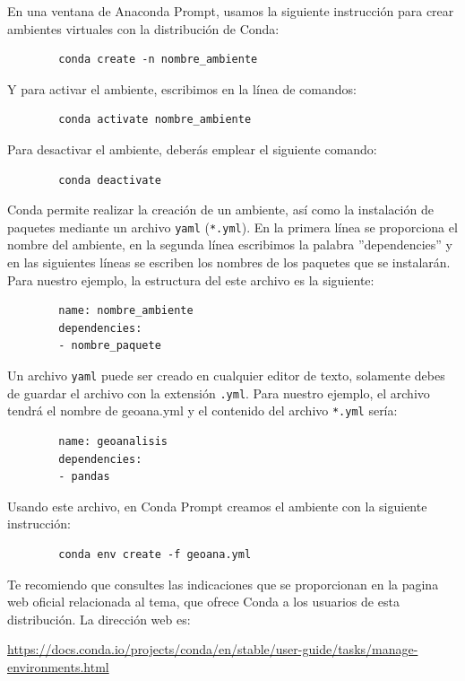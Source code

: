 \documentclass{article}
\begin{document}
	En una ventana de Anaconda Prompt, usamos la siguiente instrucción para crear ambientes virtuales con la distribución de Conda:
	\begin{verbatim}
		conda create -n nombre_ambiente
	\end{verbatim}
	
	Y para activar el ambiente, escribimos en la línea de comandos:
	\begin{verbatim}
		conda activate nombre_ambiente
	\end{verbatim}
	
	Para desactivar el ambiente, deberás emplear el siguiente comando:
	\begin{verbatim}
		conda deactivate 
	\end{verbatim}
	
	Conda permite realizar la creación de un ambiente, así como la instalación de paquetes mediante un archivo \texttt{yaml} (\texttt{*.yml}). En la primera línea se proporciona el nombre del ambiente, en la segunda línea escribimos la palabra ''dependencies'' y en las siguientes líneas se escriben los nombres de los paquetes que se instalarán. Para nuestro ejemplo, la estructura del este archivo es la siguiente:
	\begin{verbatim}
		name: nombre_ambiente
		dependencies:
		- nombre_paquete 
	\end{verbatim}
	
	Un archivo \texttt{yaml} puede ser creado en cualquier editor de texto, solamente debes de guardar el archivo con la extensión \texttt{.yml}. Para nuestro ejemplo, el archivo tendrá el nombre de geoana.yml y el contenido del archivo \texttt{*.yml} sería:
	\begin{verbatim}
		name: geoanalisis
		dependencies:
		- pandas 
	\end{verbatim}
	
	Usando este archivo, en Conda Prompt creamos el ambiente con la siguiente instrucción:
	\begin{verbatim}
		conda env create -f geoana.yml
	\end{verbatim}
	
	Te recomiendo que consultes las indicaciones que se proporcionan en la pagina web oficial relacionada al tema, que ofrece Conda a los usuarios de esta distribución. La dirección web es:\bigskip
	
	\url{https://docs.conda.io/projects/conda/en/stable/user-guide/tasks/manage-environments.html}
	
\end{document}
